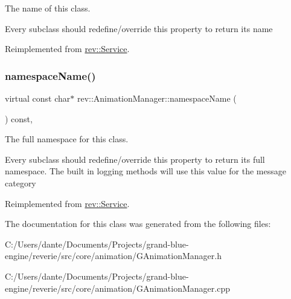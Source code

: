 The name of this class. 

Every subclass should redefine/override this property to return its name 

Reimplemented from \mbox{\hyperlink{classrev_1_1_service_a484d71757ea6e8780488602cb421a4a5}{rev\+::\+Service}}.

\mbox{\label{classrev_1_1_animation_manager_a7654304032196589413ddb5fec41981b}} 
\subsubsection{\texorpdfstring{namespaceName()}{namespaceName()}}
{\footnotesize\ttfamily virtual const char$\ast$ rev\+::\+Animation\+Manager\+::namespace\+Name (\begin{DoxyParamCaption}{ }\end{DoxyParamCaption}) const\hspace{0.3cm}{\ttfamily [inline]}, {\ttfamily [virtual]}}



The full namespace for this class. 

Every subclass should redefine/override this property to return its full namespace. The built in logging methods will use this value for the message category 

Reimplemented from \mbox{\hyperlink{classrev_1_1_service_a831f5bf8c53584ec830aaee38ea58e7b}{rev\+::\+Service}}.



The documentation for this class was generated from the following files\+:\begin{DoxyCompactItemize}
\item 
C\+:/\+Users/dante/\+Documents/\+Projects/grand-\/blue-\/engine/reverie/src/core/animation/G\+Animation\+Manager.\+h\item 
C\+:/\+Users/dante/\+Documents/\+Projects/grand-\/blue-\/engine/reverie/src/core/animation/G\+Animation\+Manager.\+cpp\end{DoxyCompactItemize}

